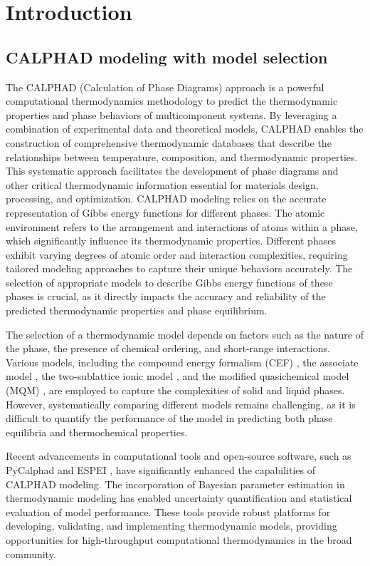 \chapter{Introduction} \label{sec:Introduction}

\section{CALPHAD modeling with model selection} \label{intro:sec:calphad}
The CALPHAD (Calculation of Phase Diagrams) approach \cite{liu2020computational, lukas2007computational} is a powerful computational thermodynamics methodology to predict the thermodynamic properties and phase behaviors of multicomponent systems. By leveraging a combination of experimental data and theoretical models, CALPHAD enables the construction of comprehensive thermodynamic databases that describe the relationships between temperature, composition, and thermodynamic properties. This systematic approach facilitates the development of phase diagrams and other critical thermodynamic information essential for materials design, processing, and optimization. CALPHAD modeling relies on the accurate representation of Gibbs energy functions for different phases. The atomic environment refers to the arrangement and interactions of atoms within a phase, which significantly influence its thermodynamic properties. Different phases exhibit varying degrees of atomic order and interaction complexities, requiring tailored modeling approaches to capture their unique behaviors accurately. The selection of appropriate models to describe Gibbs energy functions of these phases is crucial, as it directly impacts the accuracy and reliability of the predicted thermodynamic properties and phase equilibrium. 

The selection of a thermodynamic model depends on factors such as the nature of the phase, the presence of chemical ordering, and short-range interactions. Various models, including the compound energy formalism (CEF) \cite{hillert1970regular}, the associate model \cite{sommer1982association}, the two-sublattice ionic model \cite{hillert1985two}, and the modified quasichemical model (MQM) \cite{pelton2018phase}, are employed to capture the complexities of solid and liquid phases. However, systematically comparing different models remains challenging, as it is difficult to quantify the performance of the model in predicting both phase equilibria and thermochemical properties.

Recent advancements in computational tools and open-source software, such as PyCalphad \cite{otis2017pycalphad} and ESPEI \cite{bocklund2019espei}, have significantly enhanced the capabilities of CALPHAD modeling. The incorporation of Bayesian parameter estimation in thermodynamic modeling has enabled uncertainty quantification and statistical evaluation of model performance. These tools provide robust platforms for developing, validating, and implementing thermodynamic models, providing opportunities for high-throughput computational thermodynamics in the broad community.

